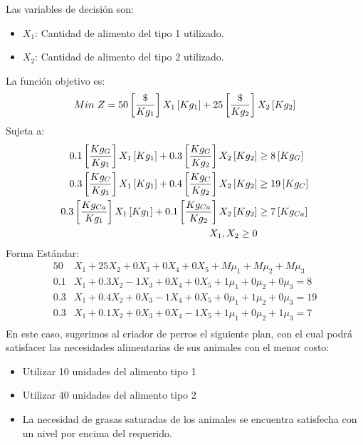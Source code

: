 \documentclass{tarea}
\begin{document}
\begin{homeworkProblem}
Las variables de decisión son:
\begin{itemize}
	\item $X_1$: Cantidad de alimento del tipo 1 utilizado.
	\item $X_2$: Cantidad de alimento del tipo 2 utilizado.
\end{itemize}
La función objetivo es: 
\begin{equation}
	Min\ Z = 50\left[ \frac{\$}{Kg_1} \right]X_1\left[ Kg_1 \right] + 25\left[ \frac{\$}{Kg_2} \right]X_2\left[ Kg_2 \right]
\end{equation}
Sujeta a:
\begin{align*}
	0.1\left[ \frac{Kg_{G}}{Kg_1} \right]X_1\left[ Kg_1 \right] + 0.3\left[ \frac{Kg_{G}}{Kg_2} \right]X_2\left[ Kg_2 \right] &\ge 8\left[ Kg_{G} \right] \\
	0.3\left[ \frac{Kg_{C}}{Kg_1} \right]X_1\left[ Kg_1 \right] + 0.4\left[ \frac{Kg_{C}}{Kg_2} \right]X_2\left[ Kg_2 \right] &\ge 19\left[ Kg_{C} \right] \\
	0.3\left[ \frac{Kg_{Ca}}{Kg_1} \right]X_1\left[ Kg_1 \right] + 0.1\left[ \frac{Kg_{Ca}}{Kg_2} \right]X_2\left[ Kg_2 \right] &\ge 7\left[ Kg_{Ca} \right] \\
	X_1,X_2 \ge 0 
\end{align*}
Forma Estándar:
\begin{align*}
50&X_1 + 25X_2 + 0X_3 + 0X_4 + 0X_5 + M\mu_1 + M\mu_2 + M\mu_3 \\
0.1&X_1 + 0.3X_2 -1X_3 + 0X_4 + 0X_5 + 1\mu_1 + 0\mu_2 + 0\mu_3 = 8\\
0.3&X_1 + 0.4X_2 +0X_3 -1X_4 + 0X_5 + 0\mu_1 + 1\mu_2 + 0\mu_3 = 19\\
0.3&X_1 + 0.1X_2  +0X_3 + 0X_4 - 1X_5 + 1\mu_1 + 0\mu_2 + 1\mu_3 = 7\\
\end{align*}
En este caso, sugerimos al criador de perros el siguiente plan, con el cual podrá satisfacer las necesidades alimentarias de sus animales con el menor costo:
\begin{itemize}
	\item Utilizar 10 unidades del alimento tipo 1
	\item Utilizar 40 unidades del alimento tipo 2
	\item La necesidad de grasas saturadas de los animales se encuentra satisfecha con un nivel por encima del requerido.
\end{itemize}
\end{homeworkProblem}
\end{document}

